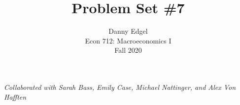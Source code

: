 \documentclass{article}
\begin{document}
\title{	Problem Set \#7 }
\author{ 	Danny Edgel 					\\ 
			Econ 712: Macroeconomics I		\\
			Fall 2020						\\
		}
\maketitle\thispagestyle{empty}


\noindent\textit{Collaborated with Sarah Bass, Emily Case, Michael Nattinger, and Alex Von Hafften}
\medskip \\

\end{document}
